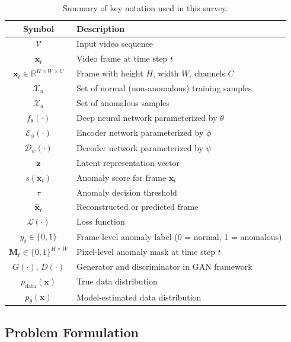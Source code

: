 \documentclass[10pt,a4paper]{article}
\renewcommand{\arraystretch}{1.12}
\begin{document}
\begin{table}[!t]
\centering
\caption{Summary of key notation used in this survey.}
\label{tab:notation}
\renewcommand{\arraystretch}{1.25}
\begin{tabular}{cl}
\toprule
\textbf{Symbol} & \textbf{Description} \\
\midrule
$\mathcal{V}$ & Input video sequence \\
$\mathbf{x}_t$ & Video frame at time step $t$ \\
$\mathbf{x}_t \in \mathbb{R}^{H \times W \times C}$ & Frame with height $H$, width $W$, channels $C$ \\
$\mathcal{X}_n$ & Set of normal (non-anomalous) training samples \\
$\mathcal{X}_a$ & Set of anomalous samples \\
$f_\theta(\cdot)$ & Deep neural network parameterized by $\theta$ \\
$\mathcal{E}_\phi(\cdot)$ & Encoder network parameterized by $\phi$ \\
$\mathcal{D}_\psi(\cdot)$ & Decoder network parameterized by $\psi$ \\
$\mathbf{z}$ & Latent representation vector \\
$s(\mathbf{x}_t)$ & Anomaly score for frame $\mathbf{x}_t$ \\
$\tau$ & Anomaly decision threshold \\
$\hat{\mathbf{x}}_t$ & Reconstructed or predicted frame \\
$\mathcal{L}(\cdot)$ & Loss function \\
$y_t \in \{0, 1\}$ & Frame-level anomaly label (0 = normal, 1 = anomalous) \\
$\mathbf{M}_t \in \{0,1\}^{H \times W}$ & Pixel-level anomaly mask at time step $t$ \\
$G(\cdot)$, $D(\cdot)$ & Generator and discriminator in GAN framework \\
$p_\text{data}(\mathbf{x})$ & True data distribution \\
$p_\theta(\mathbf{x})$ & Model-estimated data distribution \\
\bottomrule
\end{tabular}
\end{table}


\subsection{Problem Formulation}
\label{subsec:problem_formulation}
\end{document}

